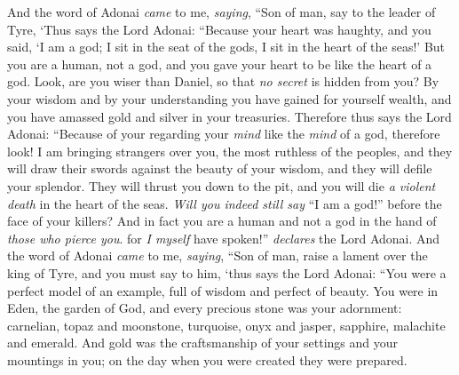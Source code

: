 \begin{biblechapter} %
 And the word of Adonai \textit{came} to me, \textit{saying},
\verse “Son of man, say to the leader of Tyre, ‘Thus says the Lord Adonai:
\verse “Because your heart was haughty, 
and you said, ‘I am a god; 
I sit in the seat of the gods, 
I sit in the heart of the seas!’ 
But you are a human, not a god, 
and you gave your heart to be like the heart of a god.
\verse Look, are you wiser than Daniel, 
so that \textit{no secret} is hidden from you?
\verse By your wisdom and by your understanding 
you have gained for yourself wealth, 
and you have amassed gold and silver 
in your treasuries.
\verse Therefore thus says the Lord Adonai:
\verse “Because of your regarding your \textit{mind} 
like the \textit{mind} of a god,
\verse therefore look! I am bringing strangers over you, 
the most ruthless of the peoples, 
and they will draw their swords against the beauty of your wisdom, 
and they will defile your splendor.
\verse They will thrust you down to the pit, 
and you will die \textit{a violent death} 
in the heart of the seas.
\verse \textit{Will you indeed still say} “I am a god!” 
before the face of your killers? 
And in fact you are a human and not a god 
in the hand of \textit{those who pierce you}. for \textit{I myself} have spoken!” \textit{declares} the Lord Adonai.
\verse And the word of Adonai \textit{came} to me, \textit{saying},
\verse “Son of man, raise a lament over the king of Tyre, and you must say to him, ‘thus says the Lord Adonai:
\verse “You were a perfect model of an example, 
full of wisdom and perfect of beauty.
\verse You were in Eden, the garden of God, 
and every precious stone was your adornment: 
carnelian, topaz and moonstone, 
turquoise, onyx and jasper, 
sapphire, malachite and emerald. 
And gold was the craftsmanship of your settings 
and your mountings in you; 
on the day when you were created they were prepared.

\end{biblechapter}
